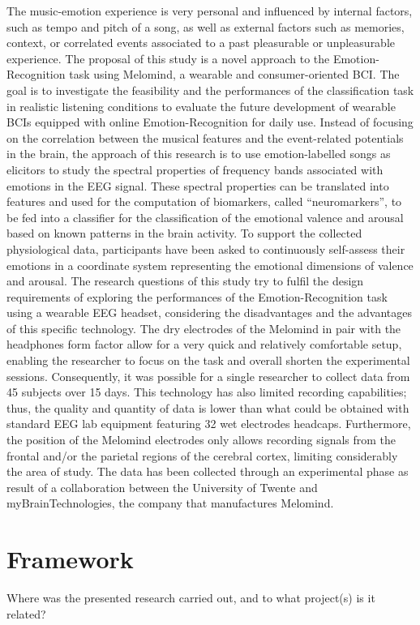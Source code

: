 The music-emotion experience is very personal and influenced by internal factors, such as tempo and pitch of a song, as well as external factors such as memories, context, or correlated events associated to a past pleasurable or unpleasurable experience. 
The proposal of this study is a novel approach to the Emotion-Recognition task using Melomind, a wearable and consumer-oriented BCI. The goal is to investigate the feasibility and the performances of the classification task in realistic listening conditions to evaluate the future development of wearable BCIs equipped with online Emotion-Recognition for daily use. Instead of focusing on the correlation between the musical features and the event-related potentials in the brain, the approach of this research is to use emotion-labelled songs as elicitors to study the spectral properties of frequency bands associated with emotions in the EEG signal. These spectral properties can be translated into features and used for the computation of biomarkers, called “neuromarkers”, to be fed into a classifier for the classification of the emotional valence and arousal based on known patterns in the brain activity. To support the collected physiological data, participants have been asked to continuously self-assess their emotions in a coordinate system representing the emotional dimensions of valence and arousal. The research questions of this study try to fulfil the design requirements of exploring the performances of the Emotion-Recognition task using a wearable EEG headset, considering the disadvantages and the advantages of this specific technology. The dry electrodes of the Melomind in pair with the headphones form factor allow for a very quick and relatively comfortable setup, enabling the researcher to focus on the task and overall shorten the experimental sessions. Consequently, it was possible for a single researcher to collect data from 45 subjects over 15 days. This technology has also limited recording capabilities; thus, the quality and quantity of data is lower than what could be obtained with standard EEG lab equipment featuring 32 wet electrodes headcaps. Furthermore, the position of the Melomind electrodes only allows recording signals from the frontal and/or the parietal regions of the cerebral cortex, limiting considerably the area of study. The data has been collected through an experimental phase as result of a collaboration between the University of Twente and myBrainTechnologies, the company that manufactures Melomind.


\section{Framework}
\label{sec:framework}
Where was the presented research carried out, and to what project(s) is it related? 

